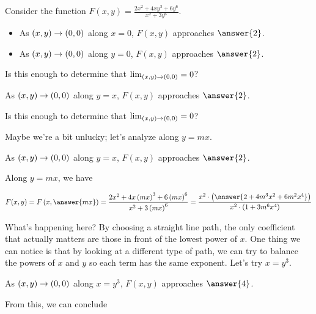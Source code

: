 \documentclass{ximera}
\author{Jim Talamo}
\begin{document}
\begin{exercise}
  Consider the function $F(x,y)= \frac{2x^2+4xy^3+6y^6}{x^2+3y^6}$.
  
  \begin{itemize}
  \item As $\left(x,y\right) \to \left(0,0\right)$ along $x=0$, $F(x,y)$ approaches $\answer{2}$.
  \item As $\left(x,y\right) \to \left(0,0\right)$ along $y=0$, $F(x,y)$ approaches $\answer{2}$.
  \end{itemize}
  
Is this enough to determine that $\lim_{\left(x,y\right) \to \left(0,0\right)} = 0$? 
   
   \begin{exercise}
As $\left(x,y\right) \to \left(0,0\right)$ along $y=x$, $F(x,y)$ approaches $\answer{2}$.
   
  Is this enough to determine that $\lim_{\left(x,y\right) \to \left(0,0\right)} = 0$? 
      
\begin{exercise}
Maybe we're a bit unlucky; let's analyze along $y=mx$.  

As $\left(x,y\right) \to \left(0,0\right)$ along $y=x$, $F(x,y)$ approaches $\answer{2}$.

\begin{hint}
Along $y=mx$, we have 

\[
F(x,y)= F\left(x,\answer{mx}\right) = \frac{2x^2+4x\left(mx\right)^3+6\left(mx\right)^6}{x^2+3\left(mx\right)^6} = \frac{x^2 \cdot \left(\answer{2+4m^3x^2+6m^2x^4} \right) }{x^2 \cdot \left(1 +3m^6x^4 \right) }
\]
\end{hint}
\begin{exercise}

What's happening here?  By choosing a straight line path, the only coefficient that actually matters are those in front of the lowest power of $x$.  One thing we can notice is that by looking at a different type of path, we can try to balance the powers of $x$ and $y$ so each term has the same exponent.  Let's try $x=y^3$.

As $\left(x,y\right) \to \left(0,0\right)$ along $x=y^3$, $F(x,y)$ approaches $\answer{4}$.

From this, we can conclude
\begin{multipleChoice}
\end{multipleChoice}


\end{exercise}
\end{exercise}
\end{exercise}
\end{exercise}
\end{document}
